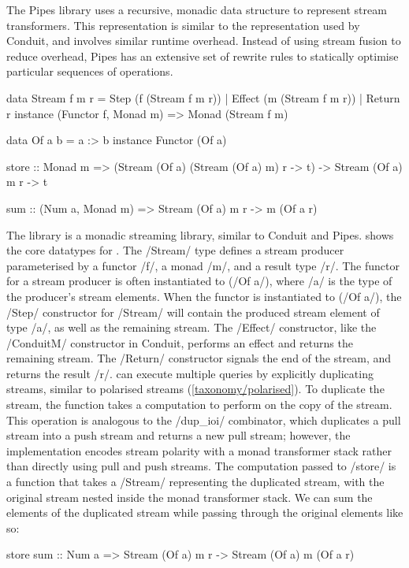 The Pipes library uses a recursive, monadic data structure to represent stream transformers.
This representation is similar to the representation used by Conduit, and involves similar runtime overhead.
Instead of using stream fusion to reduce overhead, Pipes has an extensive set of rewrite rules to statically optimise particular sequences of operations.


\begin{haskell}[float,caption=\Streaming library datatypes,label=l:bench:def:streaming]
data Stream f m r =
    Step   (f (Stream f m r))
  | Effect (m (Stream f m r))
  | Return r
instance (Functor f, Monad m) => Monad (Stream f m)

data Of a b = a :> b
instance Functor (Of a)

store :: Monad m =>
      (Stream (Of a) (Stream (Of a) m) r -> t) ->
      Stream (Of a) m r -> t

sum  :: (Num a, Monad m) =>
      Stream (Of a) m r -> m (Of a r)
\end{haskell}

The \Streaming library is a monadic streaming library, similar to Conduit and Pipes.
 shows the core datatypes for \Streaming.
The \Hs/Stream/ type defines a stream producer parameterised by a functor \Hs/f/, a monad \Hs/m/, and a result type \Hs/r/.
The functor for a stream producer is often instantiated to (\Hs/Of a/), where \Hs/a/ is the type of the producer's stream elements.
When the functor is instantiated to (\Hs/Of a/), the \Hs/Step/ constructor for \Hs/Stream/ will contain the produced stream element of type \Hs/a/, as well as the remaining stream.
The \Hs/Effect/ constructor, like the \Hs/ConduitM/ constructor in Conduit, performs an effect and returns the remaining stream.
The \Hs/Return/ constructor signals the end of the stream, and returns the result \Hs/r/.
\Streaming can execute multiple queries by explicitly duplicating streams, similar to polarised streams (\cref{taxonomy/polarised}).
To duplicate the stream, the \Hs@store@ function takes a computation to perform on the copy of the stream.
This operation is analogous to the \Hs/dup_ioi/ combinator, which duplicates a pull stream into a push stream and returns a new pull stream; however, the implementation encodes stream polarity with a monad transformer stack rather than directly using pull and push streams.
The computation passed to \Hs/store/ is a function that takes a \Hs/Stream/ representing the duplicated stream, with the original stream nested inside the monad transformer stack.
We can sum the elements of the duplicated stream while passing through the original elements like so:
\begin{haskell}
store sum :: Num a => Stream (Of a) m r -> Stream (Of a) m (Of a r)
\end{haskell}

